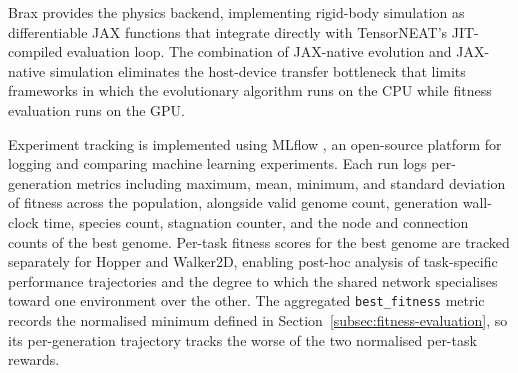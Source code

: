 \documentclass[12pt]{article}
\begin{document}
Brax \parencite{freeman_brax_2021} provides the physics backend, implementing rigid-body simulation as differentiable JAX functions that integrate directly with TensorNEAT's JIT-compiled evaluation loop.
The combination of JAX-native evolution and JAX-native simulation eliminates the host-device transfer bottleneck that limits frameworks in which the evolutionary algorithm runs on the CPU while fitness evaluation runs on the GPU.

Experiment tracking is implemented using MLflow \parencite{zaharia_accelerating_2018}, an open-source platform for logging and comparing machine learning experiments.
Each run logs per-generation metrics including maximum, mean, minimum, and standard deviation of fitness across the population, alongside valid genome count, generation wall-clock time, species count, stagnation counter, and the node and connection counts of the best genome.
Per-task fitness scores for the best genome are tracked separately for Hopper and Walker2D, enabling post-hoc analysis of task-specific performance trajectories and the degree to which the shared network specialises toward one environment over the other.
The aggregated \texttt{best\_fitness} metric records the normalised minimum defined in Section~\ref{subsec:fitness-evaluation}, so its per-generation trajectory tracks the worse of the two normalised per-task rewards.
\end{document}
